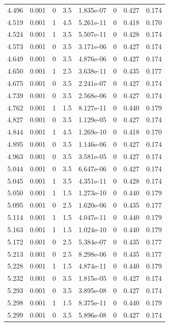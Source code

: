 \documentclass[preview]{standalone}
\begin{document}
{{{\begin{tabular}{L{1.2cm}C{1.2cm} C{0.3cm}C{0.5cm} C{1.4cm}C{1.4cm} C{1.4cm}C{1.4cm}}
  4.496  &  0.001  & 0     & 3.5 &  1.835e-07  & 0  & 0.427 &  0.174   \\ 
  4.519  &  0.001  & 1     & 4.5 &  5.261e-11  & 0  & 0.418 &  0.170   \\ 
  4.524  &  0.001  & 1     & 3.5 &  5.507e-11  & 0  & 0.428 &  0.174   \\ 
  4.573  &  0.001  & 0     & 3.5 &  3.171e-06  & 0  & 0.427 &  0.174   \\ 
  4.649  &  0.001  & 0     & 3.5 &  4.876e-06  & 0  & 0.427 &  0.174   \\ 
  4.650  &  0.001  & 1     & 2.5 &  3.638e-11  & 0  & 0.435 &  0.177   \\ 
  4.675  &  0.001  & 0     & 3.5 &  2.241e-07  & 0  & 0.427 &  0.174   \\ 
  4.739  &  0.001  & 0     & 3.5 &  2.568e-06  & 0  & 0.427 &  0.174   \\ 
  4.762  &  0.001  & 1     & 1.5 &  8.127e-11  & 0  & 0.440 &  0.179   \\ 
  4.827  &  0.001  & 0     & 3.5 &  1.129e-05  & 0  & 0.427 &  0.174   \\ 
  4.844  &  0.001  & 1     & 4.5 &  1.269e-10  & 0  & 0.418 &  0.170   \\ 
  4.895  &  0.001  & 0     & 3.5 &  1.146e-06  & 0  & 0.427 &  0.174   \\ 
  4.963  &  0.001  & 0     & 3.5 &  3.581e-05  & 0  & 0.427 &  0.174   \\ 
  5.044  &  0.001  & 0     & 3.5 &  6.647e-06  & 0  & 0.427 &  0.174   \\ 
  5.045  &  0.001  & 1     & 3.5 &  4.351e-11  & 0  & 0.428 &  0.174   \\ 
  5.050  &  0.001  & 1     & 1.5 &  1.273e-10  & 0  & 0.440 &  0.179   \\ 
  5.095  &  0.001  & 0     & 2.5 &  1.620e-06  & 0  & 0.435 &  0.177   \\ 
  5.114  &  0.001  & 1     & 1.5 &  4.047e-11  & 0  & 0.440 &  0.179   \\ 
  5.163  &  0.001  & 1     & 1.5 &  1.024e-10  & 0  & 0.440 &  0.179   \\ 
  5.172  &  0.001  & 0     & 2.5 &  5.384e-07  & 0  & 0.435 &  0.177   \\ 
  5.213  &  0.001  & 0     & 2.5 &  8.298e-06  & 0  & 0.435 &  0.177   \\ 
  5.228  &  0.001  & 1     & 1.5 &  4.874e-11  & 0  & 0.440 &  0.179   \\ 
  5.232  &  0.001  & 0     & 3.5 &  1.815e-05  & 0  & 0.427 &  0.174   \\ 
  5.293  &  0.001  & 0     & 3.5 &  3.895e-08  & 0  & 0.427 &  0.174   \\ 
  5.298  &  0.001  & 1     & 1.5 &  8.375e-11  & 0  & 0.440 &  0.179   \\ 
  5.299  &  0.001  & 0     & 3.5 &  5.896e-08  & 0  & 0.427 &  0.174   \\ 
\hline 
\end{tabular} 

}}}
\end{document}
